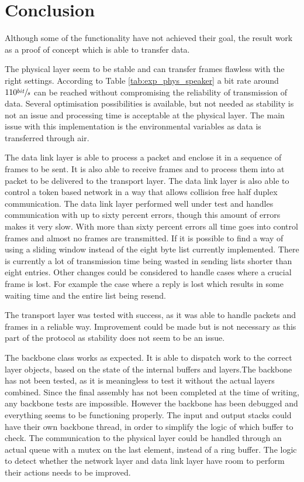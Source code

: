 \chapter{Conclusion}\label{chap:conclusion}
Although some of the functionality have not achieved their goal, the result work as a proof of concept which is able to transfer data.

The physical layer seem to be stable and can transfer frames flawless with the right settings. According to Table \ref{tab:exp_phys_speaker} a bit rate around $110\sfrac{bit}{s}$ can be reached without compromising the reliability of transmission of data. Several optimisation possibilities is available, but not needed as stability is not an issue and processing time is acceptable at the physical layer. The main issue with this implementation is the environmental variables as data is transferred through air.

The data link layer is able to process a packet and enclose it in a sequence of frames to be sent. It is also able to receive frames and to process them into at packet to be delivered to the transport layer. The data link layer is also able to control a token based network in a way that allows collision free half duplex communication. The data link layer performed well under test and handles communication with up to sixty percent errors, though this amount of errors makes it very slow. With more than sixty percent errors all time goes into control frames and almost no frames are transmitted.
If it is possible to find a way of using a sliding window instead of the eight byte list currently implemented. There is currently a lot of transmission time being wasted in sending lists shorter than eight entries. Other changes could be considered to handle cases where a crucial frame is lost. For example the case where a reply is lost which results in some waiting time and the entire list being resend.

The transport layer was tested with success, as it was able to handle packets and frames in a reliable way. Improvement could be made but is not necessary as this part of the protocol as stability does not seem to be an issue.

The backbone class works as expected. It is able to dispatch work to the correct layer objects, based on the state of the internal buffers and layers.The backbone has not been tested, as it is meaningless to test it without the actual layers combined. Since the final assembly has not been completed at the time of writing, any backbone tests are impossible. However the backbone has been debugged and everything seems to be functioning properly.
The input and output stacks could have their own backbone thread, in order to simplify the logic of which buffer to check. The communication to the physical layer could be handled through an actual queue with a mutex on the last element, instead of a ring buffer. The logic to detect whether the network layer and data link layer have room to perform their actions needs to be improved.

